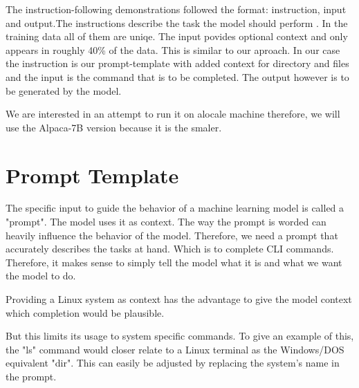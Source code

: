 The instruction-following demonstrations followed the format: instruction, input and output\cite{wang2023selfinstruct}.The instructions describe the task the model should perform . In the training data all of them are uniqe. The input povides optional context and only appears in roughly 40\% of the data.
This is similar to our aproach. In our case the instruction is our prompt-template with added context for directory and files and the input is the command that is to be completed. The output however is to be generated by the model.


We are interested in an attempt to run it on alocale machine therefore, 
we will use the Alpaca-7B version because it is the smaler. 



\pagebreak


\pagebreak








\section{Prompt Template}


The specific input to guide the behavior of a machine learning model is called a "prompt". The model uses it as context. The way the prompt is worded can heavily influence the behavior of the model. Therefore, we need a prompt that accurately describes the tasks at hand. Which is to complete CLI commands. Therefore, it makes sense to simply tell the model what it is and what we want the model to do. 



Providing a Linux system as context has the advantage to give the model context which completion would be plausible. 

But this limits its usage to system specific commands. To give an example of this, the "ls" command would closer relate to  a Linux terminal as the Windows/DOS equivalent "dir". This can easily be adjusted by replacing the system's name in the prompt.



  




